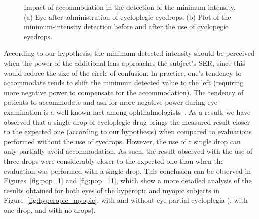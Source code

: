 
\begin{figure}[!t]
	\centering
	
	
	
	\caption[Impact of accommodation in the detection of the minimum intensity]{Impact of accommodation in the detection of the minimum intensity. (a) Eye after administration of cycloplegic eyedrops. (b) Plot of the minimum-intensity detection before and after the use of cyclopegic eyedrops.  }
	\label{fig:variation_pics}
\end{figure}

According to our hypothesis, the minimum detected intensity should be perceived when the power of the additional lens approaches the subject's SER, since this would reduce the size of the circle of confusion. In practice, one's tendency to accommodate tends to shift the minimum detected value to the left (requiring more negative power to compensate for the accommodation). 
The tendency of patients to accommodate and ask for more negative power during eye examination is a well-known fact among ophthalmologists~\cite{Kronbauer2015}. 
As a result, we have observed that a single drop of cycloplegic drug brings the measured result closer to the expected one (according to our hypothesis) when compared to evaluations performed without the use of eyedrops. However, the use of a single drop can only partially avoid accommodation. As such, the result observed with the use of three drops were considerably closer to the expected one than when the evaluation was performed with a single drop. This conclusion can be observed in Figures~\ref{fig:pop_1} and \ref{fig:pop_11}, which show a more detailed analysis of the results obtained for both eyes of the hyperopic and myopic subjects in Figure~\ref{fig:hyperopic_myopic}, with and without eye partial cycloplegia (\ie, with one drop, and with no drops).  

